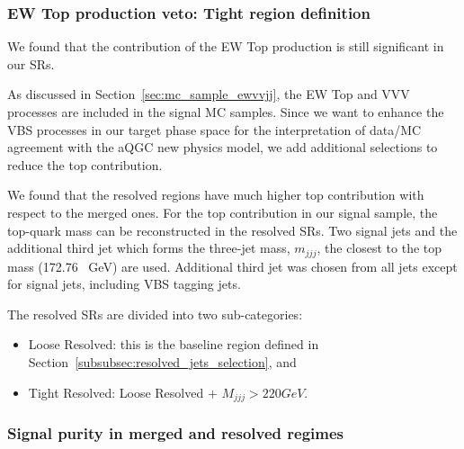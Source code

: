 \subsubsection{EW Top production veto: Tight region definition}
\label{subsec:topveto_selection}

We found that the contribution of the EW Top production is still significant in our SRs. 

As discussed in Section~\ref{sec:mc_sample_ewvvjj},
the EW Top and VVV processes are included in the signal MC samples. Since we want to enhance the VBS processes in our target phase space for the interpretation of data/MC agreement with the aQGC new physics model, we add additional selections to reduce the top contribution.


\label{subsec:LooseTightRegion}

We found that the resolved regions have much higher top contribution with respect to the merged ones.
For the top contribution in our signal sample, the top-quark mass can be reconstructed in the resolved SRs.
Two signal jets and the additional third jet which forms the three-jet mass, $m_{jjj}$, 
the closest to the top mass (172.76 \ GeV) are used. 
Additional third jet was chosen from all jets except for signal jets, including VBS tagging jets.

The resolved SRs are divided into two sub-categories:
\begin{itemize}
  \item Loose Resolved: this is the baseline region defined in Section~\ref{subsubsec:resolved_jets_selection}, and
  \item Tight Resolved: Loose Resolved + $M_{jjj} > 220 GeV$.
\end{itemize}

\subsubsection{Signal purity in merged and resolved regimes}
\label{subsec:SignalPurity}

